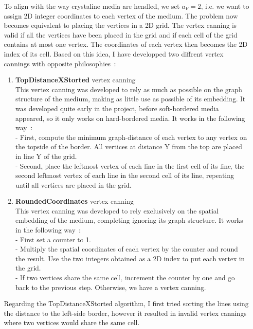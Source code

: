 \documentclass{article}
\begin{document}
To align with the way crystaline media are hendled, we set $a_V = 2$, i.e. we want to assign 2D integer coordinates to each vertex of the medium. The problem now becomes equivalent to placing the vertices in a 2D grid. The vertex canning is valid if all the vertices have been placed in the grid and if each cell of the grid contains at most one vertex. The coordinates of each vertex then becomes the 2D index of its cell. Based on this idea, I have developped two diffrent vertex cannings with opposite philosophies~:
\begin{enumerate}
	\item \textbf{TopDistanceXStorted} vertex canning\\
	This vertex canning was developed to rely as much as possible on the graph structure of the medium, making as little use as possible of its embedding. It was developed quite early in the project, before soft-bordered media appeared, so it only works on hard-bordered media. It works in the following way~:\\
	- First, compute the minimum graph-distance of each vertex to any vertex on the topside of the border. All vertices at distance Y from the top are placed in line Y of the grid.\\
	- Second, place the leftmost vertex of each line in the first cell of its line, the second leftmost vertex of each line in the second cell of its line, repeating until all vertices are placed in the grid.
	
	\item \textbf{RoundedCoordinates} vertex canning\\
	This vertex canning was developed to rely exclusively on the spatial embedding of the medium, completing ignoring its graph structure. It works in the following way~:\\
	- First set a counter to 1.\\
	- Multiply the spatial coordinates of each vertex by the counter and round the result. Use the two integers obtained as a 2D index to put each vertex in the grid.\\
	- If two vertices share the same cell, increment the counter by one and go back to the previous step. Otherwise, we have a vertex canning.
\end{enumerate}

Regarding the TopDistanceXStorted algorithm, I first tried sorting the lines using the distance to the left-side border, however it resulted in invalid vertex cannings where two vertices would share the same cell.
\end{document}
